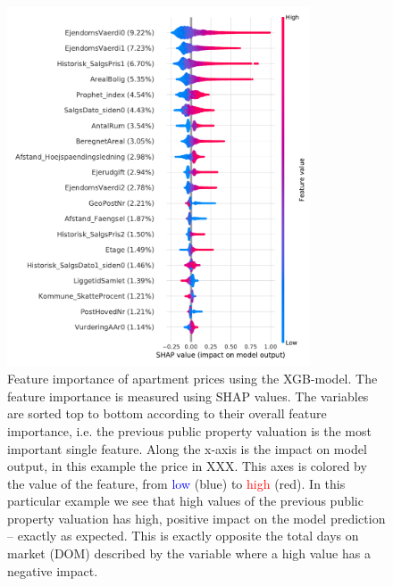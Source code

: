 \begin{figure}[ht!]
  \includegraphics[width=0.8\textwidth, trim=0 0 0 1, clip]{figures/housing/Ejerlejlighed_v19_cut_all_Ncols_all_xgb_tight_SHAP_vals_summary.pdf}
  \caption[Feature importance of apartments prices using XGB]
          {Feature importance of apartment prices using the XGB-model. The feature importance is measured using SHAP values. The variables are sorted top to bottom according to their overall feature importance, i.e. the previous public property valuation  is the most important single feature. Along the x-axis is the impact on model output, in this example the price in XXX. This axes is colored by the value of the feature, from \textcolor{blue}{low} (blue) to \textcolor{red}{high} (red). In this particular example we see that high values of the previous public property valuation has high, positive impact on the model prediction -- exactly as expected. This is exactly opposite the total days on market (DOM) described by the variable  where a high value has a negative impact.  
          } 
  \label{fig:h:shap_overview}
\end{figure}

